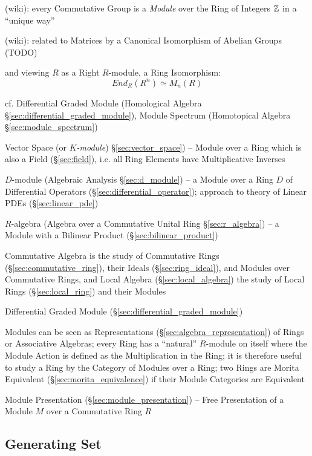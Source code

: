 (wiki): every Commutative Group is a \emph{Module} over the Ring of Integers
$\mathbb{Z}$ in a ``unique way''

(wiki): related to Matrices by a Canonical Isomorphism of Abelian Groups (TODO)

and viewing $R$ as a Right $R$-module, a Ring Isomorphism:
\[
  End_R(R^n) \simeq M_n(R)
\]

cf. Differential Graded Module (Homological Algebra
\S\ref{sec:differential_graded_module}), Module Spectrum (Homotopical Algebra
\S\ref{sec:module_spectrum})

\fist Vector Space (or \emph{$K$-module}) \S\ref{sec:vector_space}) -- Module
over a Ring which is also a Field (\S\ref{sec:field}), i.e. all Ring Elements
have Multiplicative Inverses

\fist $D$-module (Algebraic Analysis \S\ref{sec:d_module}) -- a Module over a
Ring $D$ of Differential Operators (\S\ref{sec:differential_operator}); approach
to theory of Linear PDEs (\S\ref{sec:linear_pde})

\fist $R$-algebra (Algebra over a Commutative Unital Ring \S\ref{sec:r_algebra})
-- a Module with a Bilinear Product (\S\ref{sec:bilinear_product})

\fist Commutative Algebra is the study of Commutative Rings
(\S\ref{sec:commutative_ring}), their Ideals (\S\ref{sec:ring_ideal}), and
Modules over Commutative Rings, and Local Algebra (\S\ref{sec:local_algebra})
the study of Local Rings (\S\ref{sec:local_ring}) and their Modules

\fist Differential Graded Module (\S\ref{sec:differential_graded_module})

Modules can be seen as Representations (\S\ref{sec:algebra_representation}) of
Rings or Associative Algebras; every Ring has a ``natural'' $R$-module on itself
where the Module Action is defined as the Multiplication in the Ring; it is
therefore useful to study a Ring by the Category of Modules over a Ring; two
Rings are Morita Equivalent (\S\ref{sec:morita_equivalence}) if their Module
Categories are Equivalent

\fist Module Presentation (\S\ref{sec:module_presentation}) -- Free Presentation
of a Module $M$ over a Commutative Ring $R$



\subsection{Generating Set}\label{sec:generating_set}

